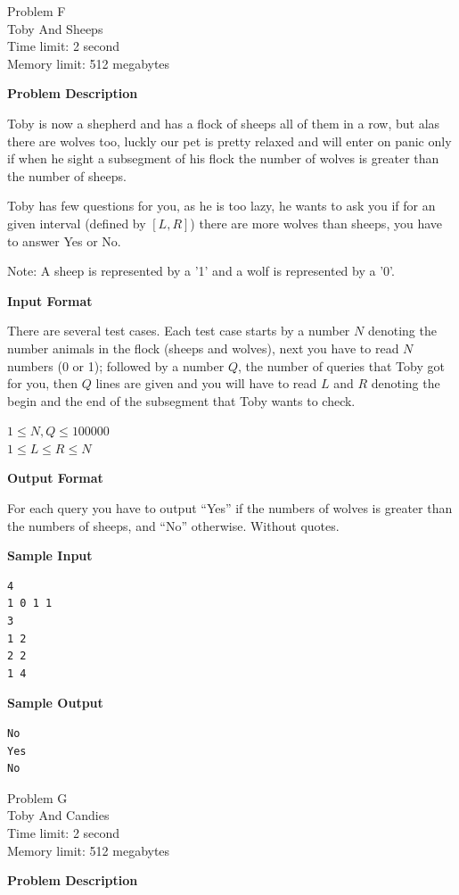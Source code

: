 \documentclass[11pt]{article}
\begin{document}
\newpage
        \begin{center}
            {\LARGE Problem F}\\
            {\Large Toby And Sheeps}\\
            {Time limit: 2 second}\\
            {Memory limit: 512 megabytes}
        \end{center}\textbf{\large Problem Description}

Toby is now a shepherd and has a flock of sheeps all of them in a row, but alas there are wolves too, luckly our pet is pretty relaxed and will enter on panic only if when he sight a subsegment of his flock the number of wolves is greater than the number of sheeps.

Toby has few questions for you, as he is too lazy, he wants to ask you if for an given interval  (defined by $[L, R]$) there are more wolves than sheeps, you have to answer Yes or No.

Note: A sheep is represented by a '1' and a wolf is represented by a '0'.

\textbf{\large Input Format}

There are several test cases.
Each test case starts by a number $N$ denoting the number animals in the flock (sheeps and wolves), next you have to read $N$ numbers (0 or 1); followed by a number $Q$, the number of queries that Toby got for you, then $Q$ lines are given and you will have to read $L$ and $R$ denoting the begin and the end of the subsegment that Toby wants to check.

$1 \le N, Q \le 100000$ \\
$1 \le L \le R \le N$

\textbf{\large Output Format}

For each query you have to output ``Yes'' if the numbers of wolves is greater than the numbers of sheeps, and ``No'' otherwise. Without quotes.

\textbf{\large Sample Input}

\begin{verbatim}
4
1 0 1 1
3
1 2
2 2
1 4
\end{verbatim}

\textbf{\large Sample Output}

\begin{verbatim}
No
Yes
No
\end{verbatim}

\newpage

        \begin{center}
            {\LARGE Problem G}\\
            {\Large Toby And Candies}\\
            {Time limit: 2 second}\\
            {Memory limit: 512 megabytes}
        \end{center}\textbf{\large Problem Description}
\end{document}
